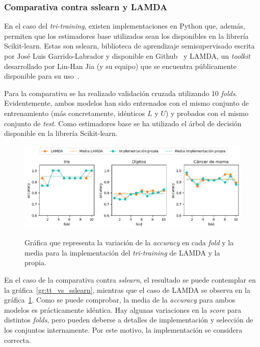 \subsubsection{Comparativa contra sslearn y LAMDA}

En el caso del \textit{tri-training}, existen implementaciones en Python que, además, permiten que los estimadores base utilizados sean los disponibles en la librería Scikit-learn. Estas son sslearn, biblioteca de aprendizaje semisupervisado escrita por José Luis Garrido-Labrador y disponible en Github~\cite{sslearnRepo} y LAMDA, un \textit{toolkit}~\cite{lamdasslPaper} desarrollado por Lin-Han Jia (y su equipo) que se encuentra públicamente disponible para su uso~\cite{lamdasslRepo}.

Para la comparativa se ha realizado validación cruzada utilizando 10 \textit{folds}. Evidentemente, ambos modelos han sido entrenados con el mismo conjunto de entrenamiento (más concretamente, idénticos $L$ y $U$) y probados con el mismo conjunto de \textit{test}. Como estimadores base se ha utilizado el árbol de decisión disponible en la librería Scikit-learn.

\begin{figure}[h]
	\caption[\textit{Tri-training}: comparativa contra LAMDA]{Gráfica que representa la variación de la \textit{accuracy} en cada \textit{fold} y la media para la implementación del \textit{tri-training} de LAMDA y la propia.}
	\centering
	\includegraphics[scale=0.62]{../img/memoria/5_tritraining_lamda}
	\label{gr:tt_vs_lamda}
\end{figure}

En el caso de la comparativa contra \textit{sslearn}, el resultado se puede contemplar en la gráfica~\ref{gr:tt_vs_sslearn}, mientras que el caso de LAMDA se observa en la gráfica~\ref{gr:tt_vs_lamda}. Como se puede comprobar, la media de la \textit{accuracy} para ambos modelos es prácticamente idéntica. Hay algunas variaciones en la \textit{score} para distintos \textit{folds}, pero pueden deberse a detalles de implementación y selección de los conjuntos internamente. Por este motivo, la implementación se considera correcta.

